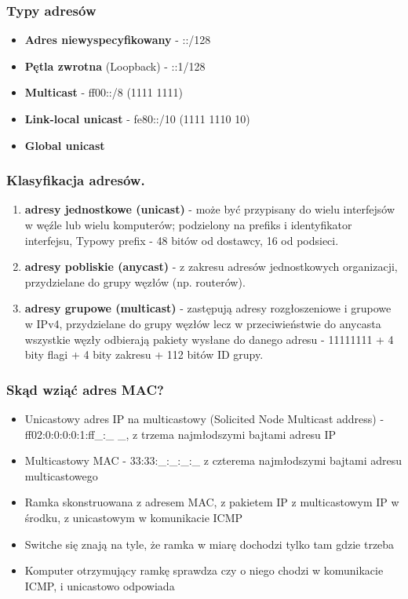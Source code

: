 \documentclass[12pt]{article}
\begin{document}
    \subsubsection{Typy adresów}
    \begin{itemize}
        \item \textbf{Adres niewyspecyfikowany} - ::/128
        \item \textbf{Pętla zwrotna} (Loopback) - ::1/128
        \item \textbf{Multicast} - ff00::/8 (1111 1111)
        \item \textbf{Link-local unicast} - fe80::/10 (1111 1110 10)
        \item \textbf{Global unicast}
    \end{itemize}

    \subsubsection{Klasyfikacja adresów.}
    \begin{enumerate}
        \item \textbf{adresy jednostkowe (unicast)} - może być przypisany do wielu interfejsów w węźle lub wielu komputerów;
        podzielony na prefiks i identyfikator interfejsu, Typowy prefix - 48 bitów od dostawcy, 16 od podsieci.
        \item \textbf{adresy pobliskie (anycast)} - z zakresu adresów jednostkowych organizacji, przydzielane do grupy
        węzłów (np. routerów).
        \item \textbf{adresy grupowe (multicast)} - zastępują adresy rozgłoszeniowe i grupowe w IPv4, przydzielane do
        grupy węzłów lecz w przeciwieństwie do anycasta wszystkie węzły odbierają pakiety wysłane do danego adresu
        - 11111111 + 4 bity flagi + 4 bity zakresu + 112 bitów ID grupy.
    \end{enumerate}

    \subsubsection{Skąd wziąć adres MAC?}
    \begin{itemize}
        \item Unicastowy adres IP na multicastowy (Solicited Node Multicast address) - ff02:0:0:0:0:1:ff\_:\_ \_,
        z trzema najmłodszymi bajtami adresu IP
        \item Multicastowy MAC - 33:33:\_:\_:\_:\_ z czterema najmłodszymi bajtami adresu multicastowego
        \item Ramka skonstruowana z adresem MAC, z pakietem IP z multicastowym IP w środku, z unicastowym w komunikacie ICMP
        \item Switche się znają na tyle, że ramka w miarę dochodzi tylko tam gdzie trzeba
        \item Komputer otrzymujący ramkę sprawdza czy o niego chodzi w komunikacie ICMP, i unicastowo odpowiada
    \end{itemize}
    \newpage
\end{document}
